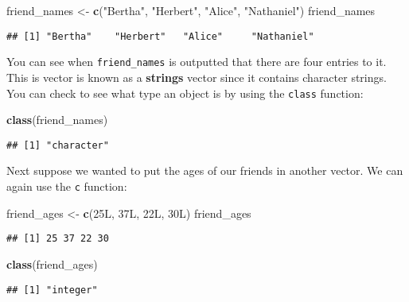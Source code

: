 \documentclass[]{tufte-book}
\newenvironment{Shaded}{\begin{snugshade}}{\end{snugshade}}
\newcommand{\KeywordTok}[1]{\textcolor[rgb]{0.13,0.29,0.53}{\textbf{#1}}}
\newcommand{\NormalTok}[1]{#1}
\newcommand{\StringTok}[1]{\textcolor[rgb]{0.31,0.60,0.02}{#1}}
\begin{document}
\begin{Shaded}
\begin{Highlighting}[]
\NormalTok{friend_names <-}\StringTok{ }\KeywordTok{c}\NormalTok{(}\StringTok{"Bertha"}\NormalTok{, }\StringTok{"Herbert"}\NormalTok{, }\StringTok{"Alice"}\NormalTok{, }\StringTok{"Nathaniel"}\NormalTok{)}
\NormalTok{friend_names}
\end{Highlighting}
\end{Shaded}

\begin{verbatim}
## [1] "Bertha"    "Herbert"   "Alice"     "Nathaniel"
\end{verbatim}

You can see when \texttt{friend\_names} is outputted that there are four entries to it. This is vector is known as a \textbf{strings} vector since it contains character strings. You can check to see what type an object is by using the \texttt{class} function:

\begin{Shaded}
\begin{Highlighting}[]
\KeywordTok{class}\NormalTok{(friend_names)}
\end{Highlighting}
\end{Shaded}

\begin{verbatim}
## [1] "character"
\end{verbatim}

Next suppose we wanted to put the ages of our friends in another vector. We can again use the \texttt{c} function:

\begin{Shaded}
\begin{Highlighting}[]
\NormalTok{friend_ages <-}\StringTok{ }\KeywordTok{c}\NormalTok{(25L, 37L, 22L, 30L)}
\NormalTok{friend_ages}
\end{Highlighting}
\end{Shaded}

\begin{verbatim}
## [1] 25 37 22 30
\end{verbatim}

\begin{Shaded}
\begin{Highlighting}[]
\KeywordTok{class}\NormalTok{(friend_ages)}
\end{Highlighting}
\end{Shaded}

\begin{verbatim}
## [1] "integer"
\end{verbatim}
\end{document}
